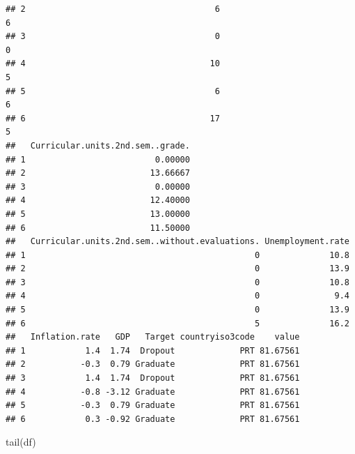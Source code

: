\documentclass[
]{article}
\newenvironment{Shaded}{\begin{snugshade}}{\end{snugshade}}
\newcommand{\FunctionTok}[1]{\textcolor[rgb]{0.00,0.00,0.00}{#1}}
\newcommand{\NormalTok}[1]{#1}
\begin{document}
\begin{verbatim}
## 2                                      6                                   6
## 3                                      0                                   0
## 4                                     10                                   5
## 5                                      6                                   6
## 6                                     17                                   5
##   Curricular.units.2nd.sem..grade.
## 1                          0.00000
## 2                         13.66667
## 3                          0.00000
## 4                         12.40000
## 5                         13.00000
## 6                         11.50000
##   Curricular.units.2nd.sem..without.evaluations. Unemployment.rate
## 1                                              0              10.8
## 2                                              0              13.9
## 3                                              0              10.8
## 4                                              0               9.4
## 5                                              0              13.9
## 6                                              5              16.2
##   Inflation.rate   GDP   Target countryiso3code    value
## 1            1.4  1.74  Dropout             PRT 81.67561
## 2           -0.3  0.79 Graduate             PRT 81.67561
## 3            1.4  1.74  Dropout             PRT 81.67561
## 4           -0.8 -3.12 Graduate             PRT 81.67561
## 5           -0.3  0.79 Graduate             PRT 81.67561
## 6            0.3 -0.92 Graduate             PRT 81.67561
\end{verbatim}

\begin{Shaded}
\begin{Highlighting}[]
\FunctionTok{tail}\NormalTok{(df)}
\end{Highlighting}
\end{Shaded}
\end{document}
